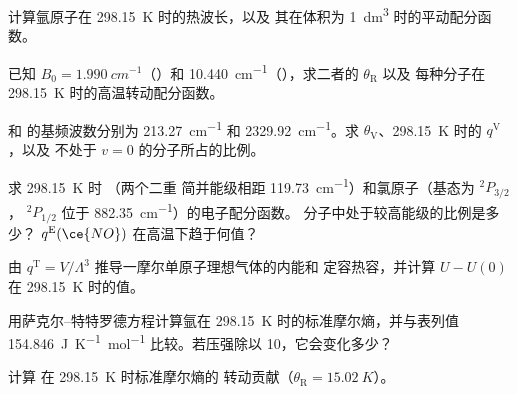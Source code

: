 \begin{exercise}[$\star$]\label{exo:b3:partition-functions:3}
计算氩原子在 \qty{298.15}{K} 时的热波长，以及
其在体积为 \qty{1}{dm^3} 时的平动配分函数。
\end{exercise}

\begin{exercise}[$\star$]\label{exo:b3:partition-functions:4}
已知 $B_0 = \qty{1.990}{cm^{-1}}$（）和 \qty{10.440}{cm^{-1}}（），求二者的 $\theta_{\mathrm R}$ 以及
每种分子在
\qty{298.15}{K} 时的高温转动配分函数。
\end{exercise}

\begin{exercise}[$\star\star$]\label{exo:b3:partition-functions:5}
 和  的基频波数分别为 \qty{213.27}{cm^{-1}} 和
\qty{2329.92}{cm^{-1}}。求 $\theta_{\mathrm V}$、\qty{298.15}{K} 时的 $q^{\mathrm V}$，以及
不处于 $v = 0$ 的分子所占的比例。
\end{exercise}

\begin{exercise}[$\star\star$]\label{exo:b3:partition-functions:6}
求 \qty{298.15}{K} 时 （两个二重
简并能级相距 \qty{119.73}{cm^{-1}}）和氯原子（基态为 ${}^2P_{3/2}$，
${}^2P_{1/2}$ 位于 \qty{882.35}{cm^{-1}}）的电子配分函数。 分子中处于较高能级的比例是多少？
$q^{\mathrm E}(\ce{NO})$ 在高温下趋于何值？
\end{exercise}

\begin{exercise}[$\star\star$]\label{exo:b3:partition-functions:7}
由 $q^{\mathrm T} = V/\Lambda^3$ 推导一摩尔单原子理想气体的内能和
定容热容，并计算 $U - U(0)$ 在
\qty{298.15}{K} 时的值。
\end{exercise}

\begin{exercise}[$\star\star$]\label{exo:b3:partition-functions:8}
用萨克尔–特特罗德方程计算氩在
\qty{298.15}{K} 时的标准摩尔熵，并与表列值
\qty{154.846}{J.K^{-1}.mol^{-1}} 比较。若压强除以 10，它会变化多少？
\end{exercise}

\begin{exercise}[$\star\star$]\label{exo:b3:partition-functions:9}
计算  在 \qty{298.15}{K} 时标准摩尔熵的
转动贡献（$\theta_{\mathrm R} = \qty{15.02}{K}$）。
\end{exercise}

